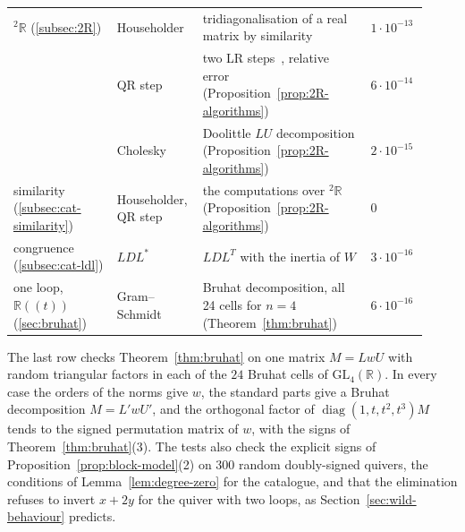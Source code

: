 \documentclass[12pt, a4paper]{report}
\theoremstyle{plain}
\theoremstyle{definition}
\theoremstyle{remark}
\theoremstyle{plain}
\newcommand{\RR}{\mathbb{R}}
\newcommand{\GL}{\mathrm{GL}}
\newcommand{\twoR}{{}^{2}\mathbb{R}}
\DeclareMathOperator{\diag}{diag}
\newcommand{\rowrule}{\arrayrulecolor{black!30}\midrule[0.3pt]\arrayrulecolor{black}}
\begin{document}
\begin{table}[htbp]
\begin{tabular}{@{}>{\raggedright\arraybackslash}p{0.24\linewidth}>{\raggedright\arraybackslash}p{0.16\linewidth}>{\raggedright\arraybackslash}p{0.39\linewidth}>{\raggedright\arraybackslash}p{0.13\linewidth}@{}}
\rowrule
$\twoR$ (\ref{subsec:2R}) & Householder & tridiagonalisation of a real matrix by similarity & $1\cdot10^{-13}$ \\ \addlinespace[3pt]
 & QR step & two LR steps~\cite{Rutishauser1958}, relative error (Proposition~\ref{prop:2R-algorithms}) & $6\cdot10^{-14}$ \\ \addlinespace[3pt]
 & Cholesky & Doolittle $LU$ decomposition (Proposition~\ref{prop:2R-algorithms}) & $2\cdot10^{-15}$ \\
\rowrule
similarity (\ref{subsec:cat-similarity}) & Householder, QR step & the computations over $\twoR$ (Proposition~\ref{prop:2R-algorithms}) & $0$ \\
\rowrule
congruence (\ref{subsec:cat-ldl}) & $LDL^*$ & $LDL^T$ with the inertia of $W$ & $3\cdot10^{-16}$ \\
\rowrule
one loop, $\RR((t))$ (\ref{sec:bruhat}) & Gram--Schmidt & Bruhat decomposition, all 24 cells for $n=4$ (Theorem~\ref{thm:bruhat}) & $6\cdot10^{-16}$ \\
\bottomrule
\end{tabular}
\end{table}

The last row checks Theorem~\ref{thm:bruhat} on one matrix $M=LwU$ with random triangular factors in each of the $24$ Bruhat cells of $\GL_4(\RR)$. In every case the orders of the norms give $w$, the standard parts give a Bruhat decomposition $M=L'wU'$, and the orthogonal factor of $\diag(1,t,t^2,t^3)M$ tends to the signed permutation matrix of $w$, with the signs of Theorem~\ref{thm:bruhat}(3). The tests also check the explicit signs of Proposition~\ref{prop:block-model}(2) on $300$ random doubly-signed quivers, the conditions of Lemma~\ref{lem:degree-zero} for the catalogue, and that the elimination refuses to invert $x+2y$ for the quiver with two loops, as Section~\ref{sec:wild-behaviour} predicts.
\end{document}
